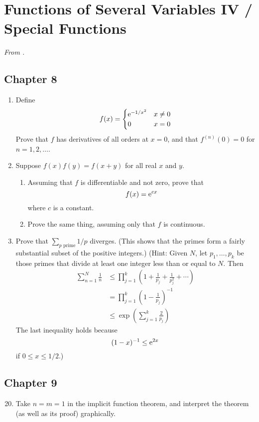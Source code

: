 \documentclass[../psets.tex]{subfiles}
\begin{document}
\section{Functions of Several Variables IV / Special Functions}
\emph{From \textcite{bib:Rudin}.}
\subsection*{Chapter 8}
\begin{enumerate}[label={\textbf{\arabic*.}}]
    \item {}Define
    \begin{equation*}
        f(x) =
        \begin{cases}
            \e[-1/x^2] & x\neq 0\\
            0 & x=0
        \end{cases}
    \end{equation*}
    Prove that $f$ has derivatives of all orders at $x=0$, and that $f^{(n)}(0)=0$ for $n=1,2,\dots$.
    \setcounter{enumi}{5}
    \item Suppose $f(x)f(y)=f(x+y)$ for all real $x$ and $y$.
    \begin{enumerate}
        \item Assuming that $f$ is differentiable and not zero, prove that
        \begin{equation*}
            f(x) = \e[cx]
        \end{equation*}
        where $c$ is a constant.
        \item Prove the same thing, assuming only that $f$ is continuous.
    \end{enumerate}
    \setcounter{enumi}{9}
    \item Prove that $\sum_{p\text{ prime}}1/p$ diverges. (This shows that the primes form a fairly substantial subset of the positive integers.) (Hint: Given $N$, let $p_1,\dots,p_k$ be those primes that divide at least one integer less than or equal to $N$. Then
    \begin{align*}
        \sum_{n=1}^N\frac{1}{n} &\leq \prod_{j=1}^k\left( 1+\frac{1}{p_j}+\frac{1}{p_j^2}+\cdots \right)\\
        &= \prod_{j=1}^k\left( 1-\frac{1}{p_j} \right)^{-1}\\
        &\leq \exp\left( \sum_{j=1}^k\frac{2}{p_j} \right)
    \end{align*}
    The last inequality holds because
    \begin{equation*}
        (1-x)^{-1} \leq \e[2x]
    \end{equation*}
    if $0\leq x\leq 1/2$.)
\end{enumerate}


\subsection*{Chapter 9}
\begin{enumerate}[label={\textbf{\arabic*.}}]
    \setcounter{enumi}{19}
    \item Take $n=m=1$ in the implicit function theorem, and interpret the theorem (as well as its proof) graphically.
\end{enumerate}
\end{document}
